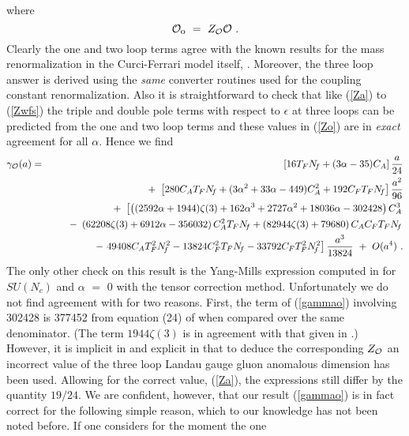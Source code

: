 \documentclass[a4paper,11pt]{article}
\newcommand{\Nf}{N_{\!f}}
\begin{document}
where
\begin{equation} 
{\cal O}_{\mbox{\footnotesize{o}}} ~=~ Z_{\cal O} {\cal O} ~.  
\end{equation} 
Clearly the one and two loop terms agree with the known results for the mass
renormalization in the Curci-Ferrari model itself, \cite{2,5,21,28,29}. 
Moreover, the three loop answer is derived using the {\em same} converter 
routines used for the coupling constant renormalization. Also it is
straightforward to check that like (\ref{Za}) to (\ref{Zwfs}) the triple and 
double pole terms with respect to $\epsilon$ at three loops can be predicted 
from the one and two loop terms and these values in (\ref{Zo}) are in 
{\em exact} agreement for all $\alpha$. Hence we find
\begin{eqnarray} 
\gamma_{\cal O}(a) &=& \left[ 16 T_F \Nf 
+ ( 3\alpha - 35 ) C_A \right] \frac{a}{24} \nonumber \\
&& +~ \left[ 280 C_A T_F \Nf + ( 3\alpha^2 + 33\alpha - 449) C_A^2 
+ 192 C_F T_F \Nf \right] \frac{a^2}{96} \nonumber \\
&& +~ \left[ \left( (2592\alpha + 1944)\zeta(3) + 162\alpha^3 + 2727\alpha^2 
+ 18036\alpha - 302428 \right) C_A^3 \right. \nonumber \\ 
&& \left. ~~~~~-~ \left( 62208\zeta(3) + 6912\alpha - 356032 \right) C_A^2 T_F 
\Nf  + \left( 82944\zeta(3) + 79680 \right) C_A C_F T_F \Nf \right. 
\nonumber \\ 
&& \left. ~~~~~-~ 49408 C_A T_F^2 \Nf^2 - 13824 C_F^2 T_F \Nf 
- 33792 C_F T_F^2 \Nf^2 \right] \frac{a^3}{13824} ~+~ O(a^4) ~. 
\label{gammao}
\end{eqnarray} 
The only other check on this result is the Yang-Mills expression computed in
\cite{2} for $SU(N_c)$ and $\alpha$ $=$ $0$ with the tensor correction method. 
Unfortunately we do not find agreement with \cite{2} for two reasons. First, 
the term of (\ref{gammao}) involving 302428 is 377452 from equation (24) of 
\cite{2} when compared over the same denominator. (The term $1944\zeta(3)$ is 
in agreement with that given in \cite{2}.) However, it is implicit in \cite{2} 
and explicit in \cite{16} that to deduce the corresponding $Z_{\cal O}$ an 
incorrect value of the three loop Landau gauge gluon anomalous dimension has 
been used. Allowing for the correct value, (\ref{Za}), the expressions still 
differ by the quantity $19/24$. We are confident, however, that our result 
(\ref{gammao}) is in fact correct for the following simple reason, which to our
knowledge has not been noted before. If one considers for the moment the one 
\end{document}
